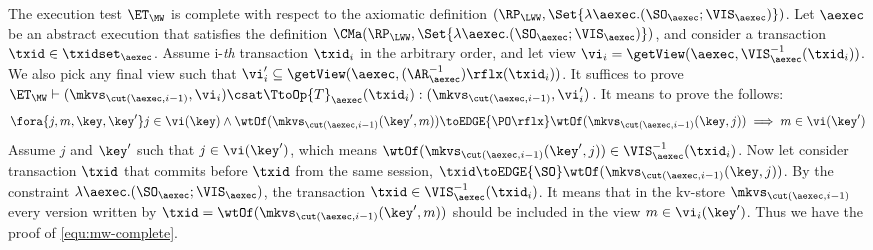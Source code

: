 The execution test $\ET_{\MW}$ is complete with respect to 
the axiomatic definition $(\RP_{\LWW}, \Set{\lambda \aexec.(\SO_{\aexec} ; \VIS_{\aexec})})$. 
Let $\aexec$ be an abstract execution that satisfies the definition
$\CMa(\RP_{\LWW}, \Set{\lambda \aexec.(\SO_{\aexec} ; \VIS_{\aexec})})$, 
and consider a transaction $\txid \in \txidset_{\aexec}$. 
Assume i-\emph{th} transaction \( \txid_i \) in the arbitrary order,
and let view \( \vi_{i} = \getView(\aexec, \VIS^{-1}_{\aexec}(\txid_{i}) ) \).
We also pick any final view such that \( \vi'_{i} \subseteq \getView(\aexec, (\AR^{-1}_{\aexec})\rflx(\txid_{i}) ) \).
It suffices to prove \( \ET_\MW \vdash (\mkvs_{\cut(\aexec, i-1)}, \vi_i ) \csat  \TtoOp{T}_{\aexec}(\txid_{i}) : (\mkvs_{\cut(\aexec, i-1)}, \vi'_{i}) \).
It means to prove the follows:
\begin{equation}
\label{equ:mw-complete}
\begin{array}{@{}l@{}}
    \fora{j,m,\key, \key' } j \in \vi(\key)  
    \wedge \wtOf(\mkvs_{\cut(\aexec, i-1)}(\key', m)) \toEDGE{\PO\rflx} \wtOf(\mkvs_{\cut(\aexec, i-1)}(\key, j))  
    \implies m \in \vi(\key')
\end{array}
\end{equation}
Assume \( j \) and \( \key' \) such that \( j \in \vi(\key')\), which means \( \wtOf(\mkvs_{\cut(\aexec, i-1)}(\key', j)) \in \VIS^{-1}_{\aexec}(\txid_{i}) \).
Now let consider transaction \( \txid \) that commits before \( \txid \) from the same session, \ie \( \txid \toEDGE{\SO} \wtOf(\mkvs_{\cut(\aexec, i-1)}(\key, j)) \).
By the constraint \( \lambda \aexec.(\SO_{\aexec} ; \VIS_{\aexec}) \), the transaction \( \txid \in \VIS^{-1}_{\aexec}(\txid_{i}) \).
It means that in the kv-store \(  \mkvs_{\cut(\aexec, i-1)} \) every version written by \( \txid =  \wtOf(\mkvs_{\cut(\aexec, i-1)}(\key', m)) \) should be included in the view \( m \in \vi_i(\key') \).
Thus we have the proof of \cref{equ:mw-complete}.
